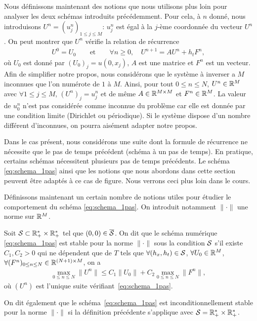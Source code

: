 \documentclass[12pt,a4paper,twoside]{article}
\begin{document}
Nous d\'efinissons maintenant des notions que nous
utilisons plus loin pour analyser les deux sch\'emas introduits pr\'ec\'edemment.
Pour cela, \`a $n$ donn\'e, nous introduisons $U^n = (u_j^n)_{1 \leq j \leq M}$:
$u_j^n$ est \'egal \`a la $j$-\`eme coordonn\'ee du vecteur $U^n$.
On peut montrer que $U^n$ v\'erifie la relation de r\'ecurrence
\begin{align}
  \label{eq:schema_1pas}
  U^0 = U_0 \qquad \text{et} \qquad \forall n \geq 0, \quad U^{n+1} = A U^n + h_t F^n ,
\end{align}
o\`u $U_0$ est donn\'e par $(U_0)_j = u(0,x_j)$, $A$ est une matrice
et $F^n$ est un vecteur.
Afin de simplifier notre propos, nous consid\'erons que le syst\`eme \`a inverser 
a $M$ inconnues que l'on num\'erote de $1$ \`a $M$.
Ainsi, pour tout $0 \leq n \leq N$,
$U^n \in \mathbb{R}^M$ avec $\forall 1 \leq j \leq M$, $(U^n)_j = u_j^n$ et de m\^eme
$A \in \mathbb{R}^{M \times M}$ et $F^n \in \mathbb{R}^M$.
La valeur de $u_0^n$ n'est pas consid\'er\'ee comme inconnue du probl\`eme
car elle est donn\'ee par une condition limite (Dirichlet ou p\'eriodique).
Si le syst\`eme dispose d'un nombre diff\'erent d'inconnues, on pourra
ais\'ement adapter notre propos.

\begin{remark}
  Dans le cas pr\'esent, nous consid\'erons une suite dont la formule de r\'ecurrence
  ne n\'ecessite que le pas de temps pr\'ec\'edent (sch\'ema \`a un pas de temps).
  En pratique, certains sch\'emas n\'ecessitent plusieurs pas de temps pr\'ec\'edents.
  Le sch\'ema \eqref{eq:schema_1pas} ainsi que les notions que nous abordons dans cette
  section peuvent \^etre adapt\'es \`a ce cas de figure.
  Nous verrons ceci plus loin dans le cours.
\end{remark}

D\'efinissons maintenant un certain nombre de notions utiles pour
\'etudier le comportement du sch\'ema \eqref{eq:schema_1pas}.
On introduit notamment $\| \cdot \|$ une norme sur $\mathbb{R}^M$.
\begin{definition}[Stabilit\'e]
  \label{def:stabilite}
  Soit $\mathcal{S} \subset \mathbb{R}_+^* \times \mathbb{R}_+^*$ tel que $(0,0) \in \overline{\mathcal{S}}$.
  On dit que le sch\'ema num\'erique \eqref{eq:schema_1pas} est stable pour la norme $\| \cdot \|$
  sous la condition $\mathcal{S}$ s'il existe $C_1 , C_2 > 0$ qui ne d\'ependent que de $T$
  tels que $\forall (h_x , h_t) \in \mathcal{S}$, $\forall U_0 \in \mathbb{R}^{M}$, 
  $\forall (F^n)_{0 \leq n \leq N} \in \mathbb{R}^{(N+1) \times M}$, on a
  \begin{align}
    \max_{0\leq n \leq N} \| U^n \| 
    \leq C_1 \| U_0 \| 
    + C_2 \max_{0\leq n \leq N} \| F^n \| ,
  \end{align}
  o\`u $(U^n)$ est l'unique suite v\'erifiant~\eqref{eq:schema_1pas}.

  On dit \'egalement que le sch\'ema~\eqref{eq:schema_1pas} 
  est inconditionnellement stable pour la norme $\| \cdot \|$
  si la d\'efinition pr\'ec\'edente
  s'applique avec $\mathcal{S} = \mathbb{R}_+^* \times \mathbb{R}_+^*$.
\end{definition}
\end{document}
